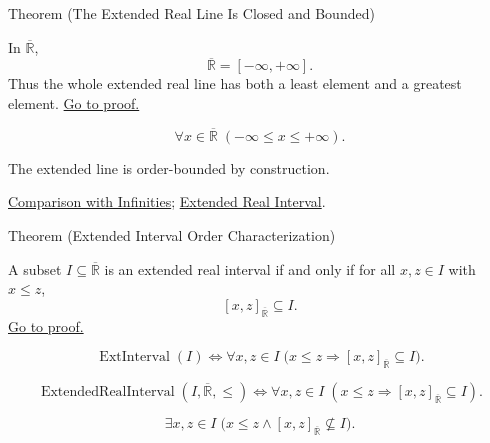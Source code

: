 \begin{theorembox}{Theorem (The Extended Real Line Is Closed and Bounded)}
\begin{theorem}
\label{thm:extended-real-line-is-closed-bounded}
In $\overline{\mathbb{R}}$,
\[
\overline{\mathbb{R}}=[-\infty,+\infty].
\]
Thus the whole extended real line has both a least element and a greatest
element.
\hyperref[prf:extended-real-line-is-closed-bounded]{Go to proof.}
\end{theorem}
\end{theorembox}
\begin{remark*}
\[
\forall x\in\overline{\mathbb{R}}\;(-\infty\le x\le+\infty).
\]
\end{remark*}
\begin{remark*}[Interpretation]
The extended line is order-bounded by construction.
\end{remark*}
\begin{dependencies}
\hyperref[thm:comparison-with-infinities]{Comparison with Infinities};
\hyperref[def:extended-real-interval]{Extended Real Interval}.
\end{dependencies}

\begin{theorembox}{Theorem (Extended Interval Order Characterization)}
\begin{theorem}
\label{thm:extended-interval-order-characterization}
A subset $I\subseteq\overline{\mathbb{R}}$ is an extended real interval if and
only if for all $x,z\in I$ with $x\le z$,
\[
[x,z]_{\overline{\mathbb{R}}}\subseteq I.
\]
\hyperref[prf:extended-interval-order-characterization]{Go to proof.}
\end{theorem}
\end{theorembox}
\begin{remark*}
\[
\operatorname{ExtInterval}(I)
\Longleftrightarrow
\forall x,z\in I\;\bigl(x\le z\Rightarrow
[x,z]_{\overline{\mathbb{R}}}\subseteq I\bigr).
\]
\end{remark*}
\begin{remark*}
\[
\operatorname{ExtendedRealInterval}(I,\overline{\mathbb{R}},\le)
\Longleftrightarrow
\forall x,z\in I\;(x\le z\Rightarrow [x,z]_{\overline{\mathbb{R}}}\subseteq I).
\]
\end{remark*}
\begin{remark*}
\[
\exists x,z\in I\;\bigl(x\le z\land [x,z]_{\overline{\mathbb{R}}}\nsubseteq I\bigr).
\]
\end{remark*}


